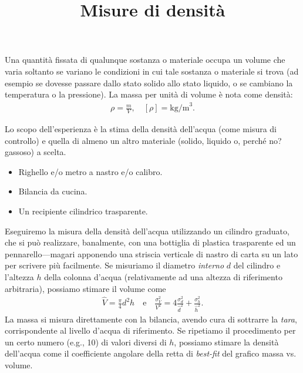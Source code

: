 \documentclass{lab1-article}
\title{Misure di densit\`a}
\begin{document}
\begin{article}

\maketitle

\secintro
Una quantit\`a fissata di qualunque sostanza o materiale occupa un volume che
varia soltanto se variano le condizioni in cui tale sostanza o materiale si
trova (ad esempio se dovesse passare dallo stato solido allo stato liquido, o se
cambiano la temperatura o la pressione). La massa per unit\`a di volume \`e nota
come densit\`a:
\begin{align}
  \rho = \frac{m}{V}, \quad [\rho]= \mathrm{kg/m}^3.
\end{align}

Lo scopo dell'esperienza \`e la stima della densit\`a dell'acqua (come misura di
controllo) e quella di almeno un altro materiale (solido, liquido o, perch\'e
no? gassoso) a scelta.

\secmaterialsdad

\begin{itemize}
\item Righello e/o metro a nastro e/o calibro.
\item Bilancia da cucina.
\item Un recipiente cilindrico trasparente.
\end{itemize}


\secmeasurements


Eseguiremo la misura della densit\`a dell'acqua utilizzando un cilindro
graduato, che si pu\`o realizzare, banalmente, con una bottiglia di plastica
trasparente ed un pennarello---magari apponendo una striscia verticale di nastro
di carta su un lato per scrivere pi\`u facilmente. Se misuriamo il diametro
\emph{interno} $d$ del cilindro e l'altezza $h$ della colonna d'acqua
(relativamente ad una altezza di riferimento arbitraria), possiamo stimare
il volume come
\begin{align}
  \hat{V} = \frac{\pi}{4} d^2h \quad \text{e} \quad
  \frac{\sigma^2_V}{V^2} = 4\frac{\sigma^2_d}{\hat{d}^2} + \frac{\sigma^2_h}{\hat{h}^2}.
\end{align}
La massa si misura direttamente con la bilancia, avendo cura di sottrarre la
\emph{tara}, corrispondente al livello d'acqua di riferimento. Se ripetiamo il
procedimento per un certo numero (e.g., 10) di valori diversi di $h$, possiamo
stimare la densit\`a dell'acqua come il coefficiente angolare della retta di
\emph{best-fit} del grafico massa vs. volume.



\end{article}
\end{document}

